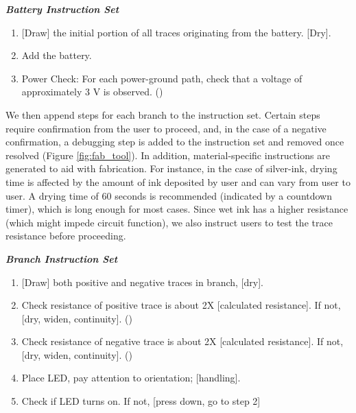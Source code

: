 \documentclass{sigchi}
\begin{document}
       \begin{framed}
                \begin{center}
                \textbf{\textit{Battery Instruction Set}}
                \end{center}
                \vspace{5pt}
                \begin{enumerate}
                      \item {[}Draw{]} the initial portion of all traces originating from the battery. [Dry].
                      \item Add the battery.
                      \item Power Check: For each power-ground path, check that a voltage of approximately 3 V is observed. ()
                \end{enumerate}
        \end{framed}        

        We then append steps for each branch to the instruction set. Certain steps require confirmation from the user to proceed, and, in the case of a negative confirmation, a debugging step is added to the instruction set and removed once resolved (Figure \ref{fig:fab_tool}). In addition, material-specific instructions are generated to aid with fabrication. For instance, in the case of silver-ink, drying time is affected by the amount of ink deposited by user and can vary from user to user. A drying time of 60 seconds is recommended (indicated by a countdown timer), which is long enough for most cases. Since wet ink has a higher resistance (which might impede circuit function), we also instruct users to test the trace resistance before proceeding. 
        
            \begin{framed}
                \begin{center}
                \textbf{\textit{Branch Instruction Set}}
                \end{center}
                \vspace{5pt}
              \begin{enumerate}  
                  \item {[}Draw{]} both positive and negative traces in branch, [dry].
                  \item Check resistance of positive trace is about 2X [calculated resistance]. If not, [dry, widen, continuity]. ()
                  \item Check resistance of negative trace is about 2X [calculated resistance]. If not, [dry, widen, continuity]. ()
                  \item Place LED, pay attention to orientation; [handling].
                  \item Check if LED turns on. If not, [press down, go to step 2]
              \end{enumerate}
            \end{framed}
     
\end{document}
